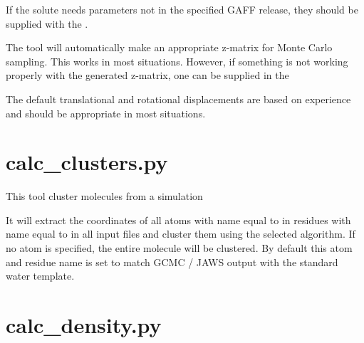 \documentclass[letterpaper,10pt,english]{sphinxmanual}
\begin{document}
If the solute needs parameters not in the specified GAFF release, they should be supplied with the .

The tool will automatically make an appropriate z-matrix for Monte Carlo sampling. This works in most situations. However, if something is not working properly with the generated z-matrix, one can be supplied in the 

The default translational and rotational displacements are based on experience and should be appropriate in most situations.


\section{calc\_clusters.py}
\label{\detokenize{tools:calc-clusters-py}}

%
\begin{sphinxVerbatim}[commandchars=\\\{\}]
  
   
    
    
\end{sphinxVerbatim}


This tool cluster molecules from a simulation

It will extract the coordinates of all atoms with name equal to  in residues with name equal to  in all input files and cluster them using the selected algorithm.  If no atom is specified, the entire molecule will be clustered. By default this atom and residue name is set to match GCMC / JAWS output with the standard water template.


\section{calc\_density.py}
\label{\detokenize{tools:calc-density-py}}
\end{document}
